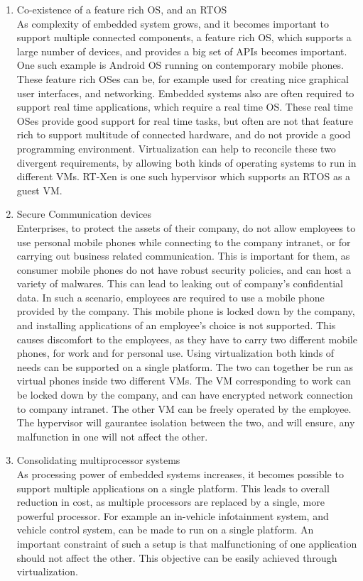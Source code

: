 \documentclass[seminar,twoside]{iitbreport}
\begin{document}
\begin{enumerate}
 \item Co-existence of a feature rich OS, and an RTOS\\
 As complexity of embedded system grows, and it becomes important to support multiple connected components, a feature rich OS, which supports a large number of devices, and 
 provides a big set of APIs becomes important. One such example is Android OS running on contemporary mobile phones. These feature rich OSes can be, for example used for creating
  nice graphical user interfaces, and networking. 
 Embedded systems also are often required to support real time applications, which require a real time OS. These real time OSes provide good support for real time tasks, but often
  are not that feature rich to support multitude of connected hardware, and do not provide a good programming environment. Virtualization can help to reconcile these two divergent requirements, 
  by allowing both kinds of operating systems to run in different VMs. RT-Xen is one such hypervisor which supports an RTOS as a guest VM.
  \item Secure Communication devices\\
  Enterprises, to protect the assets of their company, do not allow employees to use personal mobile phones while connecting to the company intranet, or for carrying out
  business related communication. This is important for them, as consumer mobile phones do not have robust security policies, and can host a variety of malwares. This can lead to
   leaking out of company's confidential data.
    In such a scenario, employees are required to use a mobile phone provided by the company. This mobile phone is locked down by the company, and installing applications of
     an employee's choice is not supported. This causes discomfort to the employees, as they have to carry two different mobile phones, for work and for personal use. 
     Using virtualization both kinds of needs can be supported on a single platform. The two can together be run as virtual phones inside two different VMs. The VM corresponding to
     work can be locked down by the company, and can have encrypted network connection to company intranet. The other VM can be freely operated by the employee.
     The hypervisor will gaurantee isolation between the two, and will ensure, any malfunction in one will not affect the other.
     \item Consolidating multiprocessor systems\\
     As processing power of embedded systems increases, it becomes possible to support multiple applications on a single platform. This leads to overall reduction in cost, as multiple 
     processors are replaced by a single, more powerful processor. For example an in-vehicle infotainment system, and 
     vehicle control system, can be made to run on a single platform. An important constraint of such a setup is that malfunctioning of one application should not 
     affect the other. This objective can be easily achieved through virtualization.
\end{enumerate}
\end{document}
